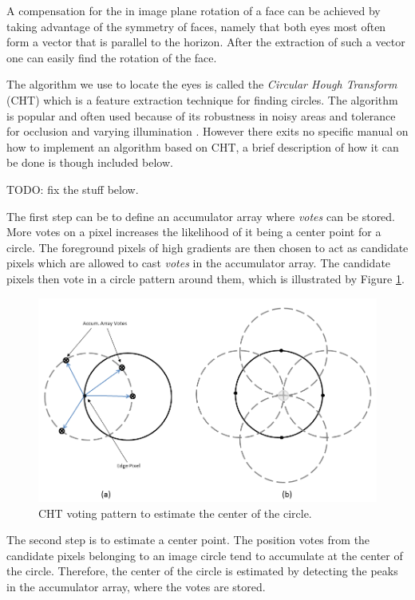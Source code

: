 A compensation for the in image plane rotation of a face can be achieved by taking advantage of the symmetry of faces, namely that both eyes most often form a vector that is parallel to the horizon. After the extraction of such a vector one can easily find the rotation of the face.

The algorithm we use to locate the eyes is called the \textit{Circular Hough Transform} (CHT) which is a feature extraction technique for finding circles. The algorithm is popular and often used because of its robustness in noisy areas and tolerance for occlusion and varying illumination \cite{cht}. However there exits no specific manual on how to implement an algorithm based on CHT, a brief description of how it can be done is though included below.

TODO: fix the stuff below.



The first step can be to define an accumulator array where \textit{votes} can be stored. More votes on a pixel increases the likelihood of it being a center point for a circle. The foreground pixels of high gradients are then chosen to act as candidate pixels which are allowed to cast \textit{votes} in the accumulator array. The candidate pixels then vote in a circle pattern around them, which is illustrated by Figure \ref{fig:CHT}.

\begin{figure}[H]
\includegraphics[scale=0.4]{img/fd/accarray.png}
\caption{CHT voting pattern to estimate the center of the circle.}
\label{fig:CHT}
\end{figure}

The second step is to estimate a center point. The position votes from the candidate pixels belonging to an image circle tend to accumulate at the center of the circle. Therefore, the center of the circle is estimated by detecting the peaks in the accumulator array, where the votes are stored.


